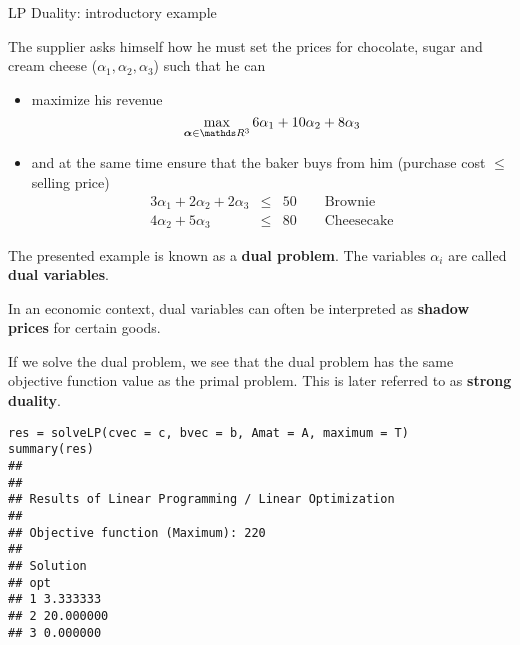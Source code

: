\documentclass[11pt,compress,t,notes=noshow, xcolor=table]{beamer}
\begin{document}
\begin{vbframe}{LP Duality: introductory example}
\lz

The supplier asks himself how he must set the prices for chocolate, sugar and cream cheese ($\alpha_1, \alpha_2, \alpha_3$) such that he can

\begin{itemize}
\item maximize his revenue
$$
\max_{\bm{\alpha} \in \R^3}6 \alpha_1 + 10 \alpha_2 + 8 \alpha_3
$$
\item and at the same time ensure that the baker buys from him (purchase cost $\le$ selling price)
\begin{eqnarray*}
3\alpha_1 + 2\alpha_2 + 2\alpha_3 &\le& 50 \qquad \text{Brownie} \\
4\alpha_2 + 5\alpha_3 &\le& 80 \qquad \text{Cheesecake}
\end{eqnarray*}

\end{itemize}

\framebreak

The presented example is known as a \textbf{dual problem}. The variables $\alpha_i$ are called \textbf{dual variables}.

\lz

In an economic context, dual variables can often be interpreted as \textbf{shadow prices} for certain goods.

\lz

If we solve the dual problem, we see that the dual problem has the same objective function value as the primal problem. This is later referred to as \textbf{strong duality}.

%
\framebreak
\footnotesize
\begin{verbatim}
res = solveLP(cvec = c, bvec = b, Amat = A, maximum = T)
summary(res)
##
##
## Results of Linear Programming / Linear Optimization
##
## Objective function (Maximum): 220
##
## Solution
## opt
## 1 3.333333
## 2 20.000000
## 3 0.000000
\end{verbatim}





\end{vbframe}
\end{document}
